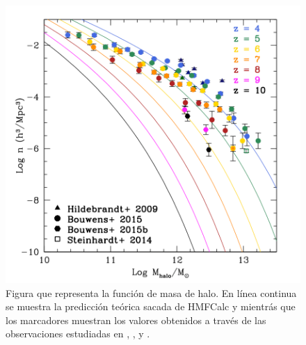 \begin{figure}[h]
	\begin{center}
	
		\includegraphics[scale=0.5]{Figures/steindhart_fig1}
		\caption{\label{fig:stein16_f1} Figura que representa la funci\'on de masa de halo. En l\'inea continua se muestra la predicci\'on te\'orica sacada de HMFCalc \citep{murray2013hmfcalc} y \cite{sheth2001ellipsoidal} mientr\'as que los marcadores muestran los valores obtenidos a trav\'es de las observaciones estudiadas en \cite{hildebrandt2009cars}, \cite{steinhardt2014uniform}, \cite{bouwens2015reionization} y \cite{bouwens2015uv}.}
		
	\end{center}
\end{figure}


